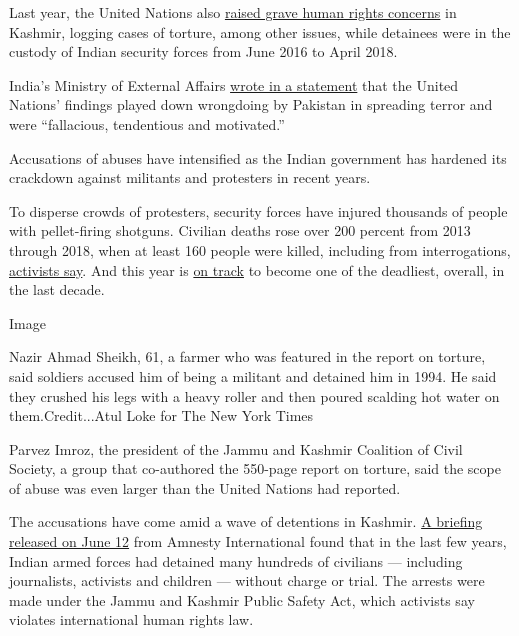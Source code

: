 Last year, the United Nations also
\href{https://www.ohchr.org/Documents/Countries/IN/DevelopmentsInKashmirJune2016ToApril2018.pdf}{raised
grave human rights concerns} in Kashmir, logging cases of torture, among
other issues, while detainees were in the custody of Indian security
forces from June 2016 to April 2018.

India's Ministry of External Affairs
\href{http://www.mea.gov.in/media-briefings.htm?dtl/29978/Official_Spokespersons_response_to_a_question_on_the_Report_by_the_Office_of_the_High_Commissioner_for_Human_Rights_on_The_human_rights_situation_in_K}{wrote
in a statement} that the United Nations' findings played down wrongdoing
by Pakistan in spreading terror and were ``fallacious, tendentious and
motivated.''

Accusations of abuses have intensified as the Indian government has
hardened its crackdown against militants and protesters in recent years.

To disperse crowds of protesters, security forces have injured thousands
of people with pellet-firing shotguns. Civilian deaths rose over 200
percent from 2013 through 2018, when at least 160 people were killed,
including from interrogations,
\href{http://jkccs.net/2018-deadliest-year-of-the-decade-jkccs-annual-human-rights-review/}{activists
say}. And this year is
\href{http://jkccs.net/six-monthly-hr-review-271-killings-177-casos-51-internet-blockades/}{on
track} to become one of the deadliest, overall, in the last decade.

Image

Nazir Ahmad Sheikh, 61, a farmer who was featured in the report on
torture, said soldiers accused him of being a militant and detained him
in 1994. He said they crushed his legs with a heavy roller and then
poured scalding hot water on them.Credit...Atul Loke for The New York
Times

Parvez Imroz, the president of the Jammu and Kashmir Coalition of Civil
Society, a group that co-authored the 550-page report on torture, said
the scope of abuse was even larger than the United Nations had reported.

The accusations have come amid a wave of detentions in Kashmir.
\href{https://amnesty.org.in/news-update/amnesty-international-india-calls-for-the-repeal-of-jk-public-safety-act-in-a-new-briefing/}{A
briefing released on June 12} from Amnesty International found that in
the last few years, Indian armed forces had detained many hundreds of
civilians --- including journalists, activists and children --- without
charge or trial. The arrests were made under the Jammu and Kashmir
Public Safety Act, which activists say violates international human
rights law.

